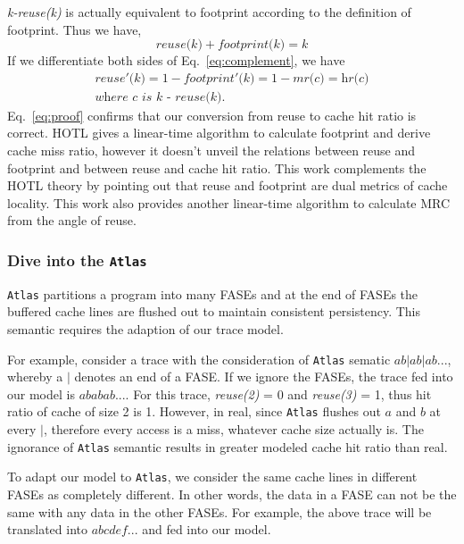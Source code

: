 \documentclass[preprint,nocopyrightspace,10pt]{sigplanconf}
\begin{document}
\emph{k-reuse(k)} is actually equivalent to footprint according to the definition of footprint.
Thus we have, 
\begin{equation}
\textit{reuse(k)} + \textit{footprint(k)} = \textit{k}
\label{eq:complement}
\end{equation}
\noindent
If we differentiate both sides of Eq.~\ref{eq:complement}, we have 
\begin{equation}
\begin{multlined}
\textit{reuse}'\textit{(k)} = 1 - \textit{footprint}'\textit{(k)} = 1 - \textit{mr(c)} = \textit{hr(c)} \\
\textit{where c is k - reuse(k).}
\end{multlined}
\label{eq:proof}
\end{equation}
\noindent
Eq.~\ref{eq:proof} confirms that our conversion from reuse to cache hit ratio is correct.
HOTL gives a linear-time algorithm to calculate footprint and derive cache miss ratio, 
however it doesn't unveil the relations between reuse and footprint and between reuse 
and cache hit ratio. This work complements the HOTL theory by pointing out that reuse
and footprint are dual metrics of cache locality. This work also provides another linear-time 
algorithm to calculate MRC from the angle of reuse. 

\subsubsection{Dive into the \texttt{Atlas}}

\texttt{Atlas} partitions a program into many FASEs and at the end of FASEs 
the buffered cache lines are flushed out to maintain consistent persistency. 
This semantic requires the adaption of our trace model. 

For example, consider a trace with the consideration of \texttt{Atlas} sematic 
$ab|ab|ab...$, whereby a $|$ denotes an end of a FASE. If we ignore the FASEs, 
the trace fed into our model is $ababab...$. For this trace, \emph{reuse(2)} = 0 
and \emph{reuse(3)} = 1, thus hit ratio of cache of size 2 is 1. However, 
in real, since \texttt{Atlas} flushes out $a$ and $b$ at every $|$, therefore every
access is a miss, whatever cache size actually is. The ignorance of \texttt{Atlas}
semantic results in greater modeled cache hit ratio than real.

To adapt our model to \texttt{Atlas}, we consider the same cache lines in different
FASEs as completely different. In other words, the data in a FASE can not be the same with any 
data in the other FASEs. For example, the above trace will be translated into 
$abcdef...$ and fed into our model.
\end{document}
